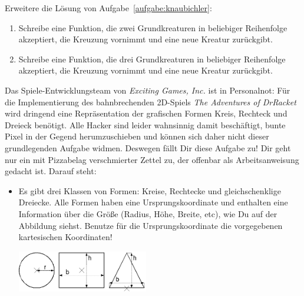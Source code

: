 \begin{aufgabe}
  \label{aufgabe:knaubichler2}
  Erweitere die Lösung von Aufgabe~\ref{aufgabe:knaubichler}:
  
  \begin{enumerate}
  \item Schreibe eine Funktion, die zwei
    Grundkreaturen in beliebiger Reihenfolge akzeptiert, die Kreuzung
    vornimmt und eine neue Kreatur zurückgibt.
    
  \item Schreibe eine
    Funktion, die drei Grundkreaturen in beliebiger Reihenfolge
    akzeptiert, die Kreuzung vornimmt und eine neue Kreatur
    zurückgibt.
  \end{enumerate}
\end{aufgabe}     

\begin{aufgabe}

  Das Spiele-Entwicklungsteam von
  \textit{Exciting Games, Inc.} ist in Personalnot: Für die
  Implementierung des bahnbrechenden 2D-Spiels \textit{The Adventures
    of DrRacket} wird dringend eine Repräsentation der grafischen
  Formen Kreis, Rechteck und Dreieck benötigt.  Alle Hacker
  sind leider wahnsinnig damit beschäftigt, bunte Pixel in der Gegend
  herumzuschieben und können sich daher nicht dieser grundlegenden
  Aufgabe widmen.  Deswegen fällt Dir diese Aufgabe zu!  Dir geht
  nur ein mit Pizzabelag verschmierter Zettel zu, der offenbar als
  Arbeitsanweisung gedacht ist.  Darauf steht:
  \begin{itemize}

  \item Es gibt drei Klassen von Formen: Kreise, Rechtecke und
    gleichschenklige Dreiecke.  Alle Formen haben eine
    Ursprungskoordinate und enthalten eine Information über die Größe
    (Radius, Höhe, Breite, etc), wie Du auf der Abbildung siehst.
    Benutze für die Ursprungskoordinate die vorgegebenen kartesischen
    Koordinaten!

    \begin{center}
      \includegraphics[height=1.8cm]{gemischte-daten/shapes.png}
    \end{center}


\end{itemize}
\end{aufgabe}
